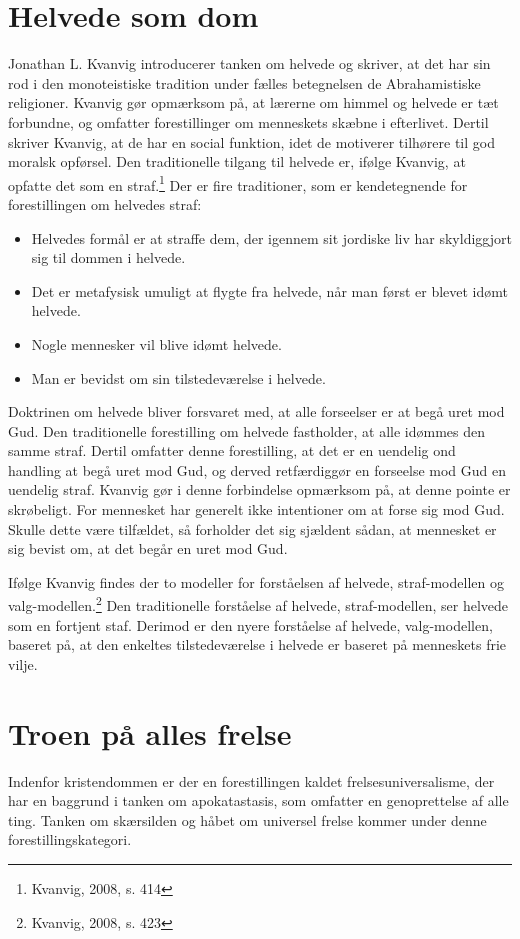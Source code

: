 \section{Helvede som dom}
Jonathan L. Kvanvig introducerer tanken om helvede og skriver, at det har sin rod i den monoteistiske tradition under fælles betegnelsen de Abrahamistiske religioner. Kvanvig gør opmærksom på, at lærerne om himmel og helvede er tæt forbundne, og omfatter forestillinger om menneskets skæbne i efterlivet. Dertil skriver Kvanvig, at de har en social funktion, idet de motiverer tilhørere til god moralsk opførsel. Den traditionelle tilgang til helvede er, ifølge Kvanvig, at opfatte det som en straf.\footnote{Kvanvig, 2008, s. 414} Der er fire traditioner, som er kendetegnende for forestillingen om helvedes straf:

\begin{itemize}
\item Helvedes formål er at straffe dem, der igennem sit jordiske liv har skyldiggjort sig til dommen i helvede.
\item Det er metafysisk umuligt at flygte fra helvede, når man først er blevet idømt helvede.
\item Nogle mennesker vil blive idømt helvede.
\item Man er bevidst om sin tilstedeværelse i helvede.
\end{itemize}

Doktrinen om helvede bliver forsvaret med, at alle forseelser er at begå uret mod Gud. Den traditionelle forestilling om helvede fastholder, at alle idømmes den samme straf. Dertil omfatter denne forestilling, at det er en uendelig ond handling at begå uret mod Gud, og derved retfærdiggør en forseelse mod Gud en uendelig straf. Kvanvig gør i denne forbindelse opmærksom på, at denne pointe er skrøbeligt. For mennesket har generelt ikke intentioner om at forse sig mod Gud. Skulle dette være tilfældet, så forholder det sig sjældent sådan, at mennesket er sig bevist om, at det begår en uret mod Gud. 

Ifølge Kvanvig findes der to modeller for forståelsen af helvede, straf-modellen og valg-modellen.\footnote{Kvanvig, 2008, s. 423} Den traditionelle forståelse af helvede, straf-modellen, ser helvede som en fortjent staf. Derimod er den nyere forståelse af helvede, valg-modellen, baseret på, at den enkeltes tilstedeværelse i helvede er baseret på menneskets frie vilje.

\section{Troen på alles frelse}
Indenfor kristendommen er der en forestillingen kaldet frelsesuniversalisme, der har en baggrund i tanken om apokatastasis, som omfatter en genoprettelse af alle ting. Tanken om skærsilden og håbet om universel frelse kommer under denne forestillingskategori.

